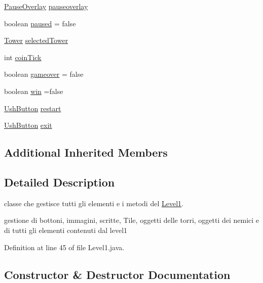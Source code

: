 \begin{DoxyCompactItemize}
\hyperlink{classui_1_1_pause_overlay}{Pause\+Overlay} \hyperlink{classscenes_1_1_level1_a544fb9294d892e35b4b0316e07997cd6}{pauseoverlay}
\item 
boolean \hyperlink{classscenes_1_1_level1_aa1e43f4bcbc826434b83c0f3ec507143}{paused} = false
\item 
\hyperlink{classtowers_1_1_tower}{Tower} \hyperlink{classscenes_1_1_level1_af6b1162bc2f00f8d549aae075ddd5a8b}{selected\+Tower}
\item 
int \hyperlink{classscenes_1_1_level1_aa48bc6c9a2648651d6484c9063ca1b8f}{coin\+Tick}
\item 
boolean \hyperlink{classscenes_1_1_level1_a962cec751fe966ea7bf381c68ab5c70f}{gameover} = false
\item 
boolean \hyperlink{classscenes_1_1_level1_a1cc7b399bb950a160021766cd9a126f8}{win} =false
\item 
\hyperlink{classui_1_1_ush_button}{Ush\+Button} \hyperlink{classscenes_1_1_level1_ac1d34384911014e49613ccfb1abddbcc}{restart}
\item 
\hyperlink{classui_1_1_ush_button}{Ush\+Button} \hyperlink{classscenes_1_1_level1_a08590df28bf721b1cf1670cf0f8f7341}{exit}
\end{DoxyCompactItemize}
\subsection*{Additional Inherited Members}


\subsection{Detailed Description}
classe che gestisce tutti gli elementi e i metodi del \hyperlink{classscenes_1_1_level1}{Level1}. 

gestione di bottoni, immagini, scritte, Tile, oggetti delle torri, oggetti dei nemici e di tutti gli elementi contenuti dal level1 

Definition at line 45 of file Level1.\+java.



\subsection{Constructor \& Destructor Documentation}
\mbox{\label{classscenes_1_1_level1_a0662011b3c0aa5d7dd21ce7cf353c3a0}} 
